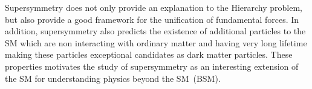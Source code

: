 {%
Supersymmetry does not only provide an explanation to the Hierarchy problem, but also provide a good framework for
the unification of fundamental forces. In addition, supersymmetry also predicts the existence of additional particles to the SM which are
non interacting with ordinary matter and having very long lifetime making these particles exceptional candidates as dark matter
particles. These properties motivates the study of supersymmetry as an interesting extension of the SM for understanding
physics beyond the SM~(BSM).
}

